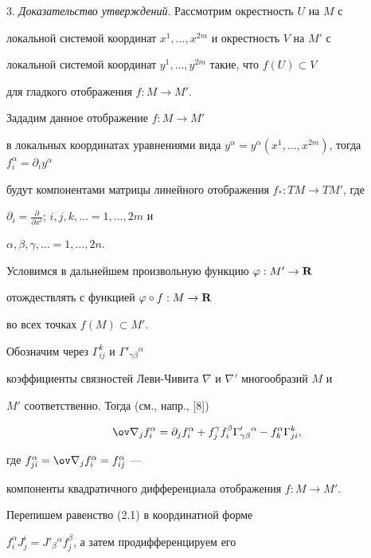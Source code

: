 3. {\it Доказательство утверждений}. Рассмотрим окрестность $U$ на $M$ с


локальной системой координат $x^1,\dotsc,x^{2m}$ и окрестность $V$ на $M'$ с


локальной системой координат $y^1,\dotsc, y^{2m}$ такие, что $f(U)\subset V$


для гладкого отображения $f:M{\to}M'$.


Зададим данное отображение $f:M{\to}M'$


в локальных координатах уравнениями вида $y^{\alpha }=


y^{\alpha}(x^1,\dotsc,x^{2m})$, тогда $f_i^{\alpha}=\partial _i y^{\alpha}$


будут компонентами матрицы линейного отображения $f_*:TM \to TM'$, где


$\partial _i=\frac{\partial}{\partial x^i}$; $i,j,k,\dotsc =1,\dotsc,2m$ и


$\alpha ,\beta ,\gamma ,\dotsc=1,\dotsc, 2n$.





Условимся в дальнейшем произвольную функцию $\varphi :M' \to {\bold R}$


отождествлять с функцией $\varphi \circ f:M \to {\bold R}$


во всех точках $f(M)\subset M'$.





Обозначим через $\Gamma _{ij}^k$ и $\Gamma'_{\gamma \beta}{}^{\alpha}$


коэффициенты связностей Леви-Чивита $\nabla$ и $\nabla '$ многообразий $M$ и


$M'$ соответственно. Тогда (см., напр., [8])


$$


\ov \nabla _j f_i^{\alpha}=\partial _j f_i^{\alpha }+ f_j^{\gamma }


f_i^{\beta }\Gamma '_{\gamma \beta }{}^{\alpha }-


f_k^{\alpha } \Gamma _{ji}^k,


$$


где $f_{ji}^{\alpha}=\ov \nabla_j f_i^{\alpha }=f_{ij}^{\alpha }$ ---


компоненты квадратичного дифференциала отображения $f:M \to M'$.





Перепишем равенство (2.1) в координатной форме


$f_i^\alpha J_j^i=J'_\beta{}^\alpha f_j^\beta$, а затем продифференцируем его


